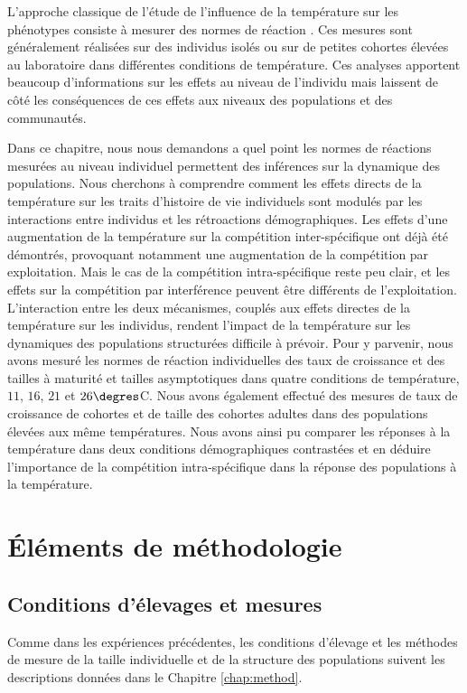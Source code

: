L'approche classique de l'étude de l'influence de la température sur les
phénotypes consiste à mesurer des normes de réaction \autocites{woltereck1909a}.
Ces mesures sont généralement réalisées sur des individus isolés ou sur de
petites cohortes élevées au laboratoire dans différentes conditions de
température. Ces analyses apportent beaucoup d'informations sur les effets au
niveau de l'individu mais laissent de côté les conséquences de ces effets aux
niveaux des populations et des communautés. 

Dans ce chapitre, nous nous demandons a quel point les normes de réactions
mesurées au niveau individuel permettent des inférences sur la dynamique des
populations. Nous cherchons à comprendre comment les effets directs de la
température sur les traits d'histoire de vie individuels sont modulés par les
interactions entre individus et les rétroactions démographiques.
Les effets d'une augmentation de la température sur la compétition
inter-spécifique ont déjà été démontrés, provoquant notamment une augmentation
de la compétition par exploitation. Mais le cas de la compétition
intra-spécifique reste peu clair, et les effets sur la compétition par
interférence peuvent être différents de l'exploitation. L'interaction entre
les deux mécanismes, couplés aux effets directes de la température sur les individus,
rendent l'impact de la température sur les dynamiques des populations
structurées difficile à prévoir. Pour y parvenir, nous avons mesuré les normes de réaction
individuelles des taux de croissance et des tailles à maturité et tailles
asymptotiques dans quatre conditions de température, $11$, $16$, $21$ et
$26\degres$C. Nous avons également effectué des mesures de taux de croissance de
cohortes et de taille des cohortes adultes dans des populations élevées aux même
températures. Nous avons ainsi pu comparer les réponses à la température dans
deux conditions démographiques contrastées et en déduire l'importance de la
compétition intra-spécifique dans la réponse des populations à la température.

\section{Éléments de méthodologie}

\subsection{Conditions d'élevages et mesures}

Comme dans les expériences précédentes, les conditions d'élevage et les méthodes
de mesure de la taille individuelle et de la structure des populations suivent
les descriptions données dans le Chapitre \ref{chap:method}.

